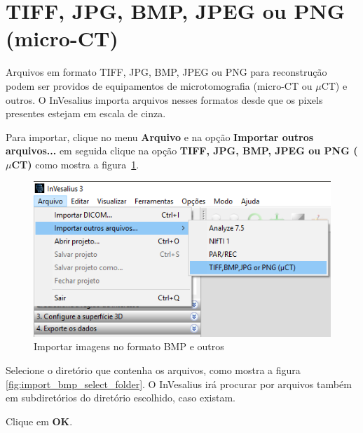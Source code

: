 \section{TIFF, JPG, BMP, JPEG ou PNG (micro-CT)}

Arquivos em formato TIFF, JPG, BMP, JPEG ou PNG para reconstrução podem ser providos de equipamentos de microtomografia (micro-CT ou $\mu$CT) e outros. O InVesalius importa arquivos nesses formatos desde que os pixels presentes estejam em escala de cinza.

Para importar, clique no menu \textbf{Arquivo} e na opção \textbf{Importar outros arquivos...} em seguida clique na opção \textbf{TIFF, JPG, BMP, JPEG ou PNG ($\mu$CT)} como mostra a figura~\ref{fig:import_bmp_menu_pt}. 

\begin{figure}[!htb]
\centering
\includegraphics[scale=0.4]{../user_guide_figures/invesalius_screen/import_bmp_menu_pt.png}
\caption{Importar imagens no formato BMP e outros}
\label{fig:import_bmp_menu_pt}
\end{figure}

Selecione o diretório que contenha os arquivos, como mostra a figura \ref{fig:import_bmp_select_folder}. O InVesalius irá procurar por arquivos também em subdiretórios do diretório escolhido, caso existam.

Clique em \textbf{OK}.

